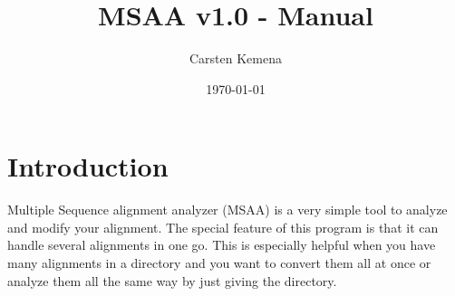 \documentclass[a4paper,10pt,parskip=half]{scrartcl}
\title{MSAA v1.0 - Manual}
\author{Carsten Kemena}
\date{\today}
\begin{document}
\maketitle





\section{Introduction}
Multiple Sequence alignment analyzer (MSAA) is a very simple tool to analyze and modify your alignment. The special feature of this program is that it can handle several alignments in one go. This is especially helpful when you have many alignments in a directory and you want to convert them all at once or analyze them all the same way by just giving the directory.
\end{document}
